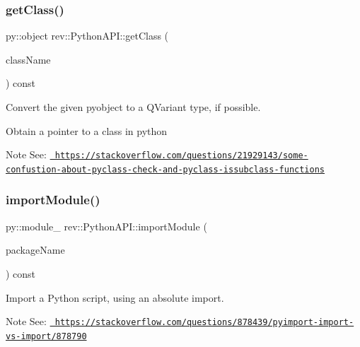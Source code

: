 \subsubsection{\texorpdfstring{getClass()}{getClass()}}
{\footnotesize\ttfamily py\+::object rev\+::\+Python\+A\+P\+I\+::get\+Class (\begin{DoxyParamCaption}\item[{const \mbox{\hyperlink{classrev_1_1_g_string}{G\+String}} \&}]{class\+Name }\end{DoxyParamCaption}) const}



Convert the given pyobject to a Q\+Variant type, if possible. 

Obtain a pointer to a class in python \begin{DoxyNote}{Note}
See\+: \href{https://stackoverflow.com/questions/21929143/some-confustion-about-pyclass-check-and-pyclass-issubclass-functions}{\texttt{ https\+://stackoverflow.\+com/questions/21929143/some-\/confustion-\/about-\/pyclass-\/check-\/and-\/pyclass-\/issubclass-\/functions}} 
\end{DoxyNote}
\mbox{\label{classrev_1_1_python_a_p_i_a96781b2064238a48cd2e80da8a55cd36}} 
\subsubsection{\texorpdfstring{importModule()}{importModule()}}
{\footnotesize\ttfamily py\+::module\+\_\+ rev\+::\+Python\+A\+P\+I\+::import\+Module (\begin{DoxyParamCaption}\item[{const \mbox{\hyperlink{classrev_1_1_g_string}{G\+String}} \&}]{package\+Name }\end{DoxyParamCaption}) const}



Import a Python script, using an absolute import. 

\begin{DoxyNote}{Note}
See\+: \href{https://stackoverflow.com/questions/878439/pyimport-import-vs-import/878790}{\texttt{ https\+://stackoverflow.\+com/questions/878439/pyimport-\/import-\/vs-\/import/878790}} 
\end{DoxyNote}
\mbox{\label{classrev_1_1_python_a_p_i_ac2e3121630ff3d6cd2df2957958d25e2}} 
